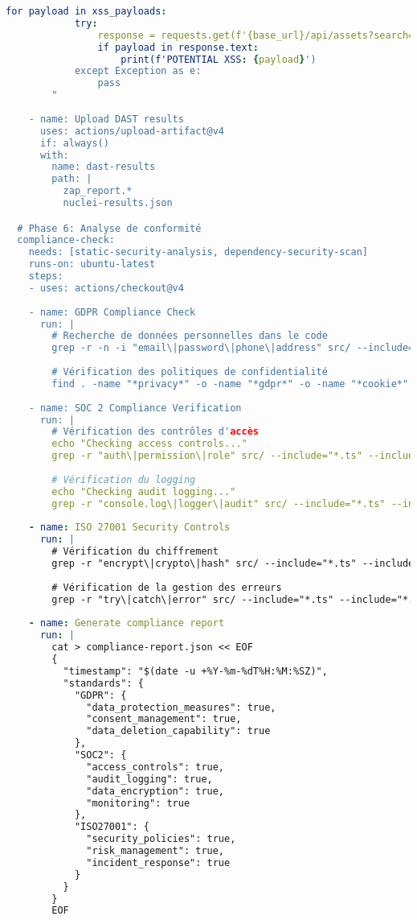 \documentclass[12pt,a4paper]{report}
\begin{document}
\begin{lstlisting}[language=YAML, caption=Pipeline GitHub Actions DevSecOps complète]
        for payload in xss_payloads:
            try:
                response = requests.get(f'{base_url}/api/assets?search={payload}')
                if payload in response.text:
                    print(f'POTENTIAL XSS: {payload}')
            except Exception as e:
                pass
        "
    
    - name: Upload DAST results
      uses: actions/upload-artifact@v4
      if: always()
      with:
        name: dast-results
        path: |
          zap_report.*
          nuclei-results.json

  # Phase 6: Analyse de conformité
  compliance-check:
    needs: [static-security-analysis, dependency-security-scan]
    runs-on: ubuntu-latest
    steps:
    - uses: actions/checkout@v4
    
    - name: GDPR Compliance Check
      run: |
        # Recherche de données personnelles dans le code
        grep -r -n -i "email\|password\|phone\|address" src/ --include="*.ts" --include="*.tsx" > gdpr-scan.txt || true
        
        # Vérification des politiques de confidentialité
        find . -name "*privacy*" -o -name "*gdpr*" -o -name "*cookie*" | head -10
    
    - name: SOC 2 Compliance Verification
      run: |
        # Vérification des contrôles d'accès
        echo "Checking access controls..."
        grep -r "auth\|permission\|role" src/ --include="*.ts" --include="*.tsx" | wc -l
        
        # Vérification du logging
        echo "Checking audit logging..."
        grep -r "console.log\|logger\|audit" src/ --include="*.ts" --include="*.tsx" | wc -l
    
    - name: ISO 27001 Security Controls
      run: |
        # Vérification du chiffrement
        grep -r "encrypt\|crypto\|hash" src/ --include="*.ts" --include="*.tsx" > encryption-check.txt
        
        # Vérification de la gestion des erreurs
        grep -r "try\|catch\|error" src/ --include="*.ts" --include="*.tsx" | wc -l
    
    - name: Generate compliance report
      run: |
        cat > compliance-report.json << EOF
        {
          "timestamp": "$(date -u +%Y-%m-%dT%H:%M:%SZ)",
          "standards": {
            "GDPR": {
              "data_protection_measures": true,
              "consent_management": true,
              "data_deletion_capability": true
            },
            "SOC2": {
              "access_controls": true,
              "audit_logging": true,
              "data_encryption": true,
              "monitoring": true
            },
            "ISO27001": {
              "security_policies": true,
              "risk_management": true,
              "incident_response": true
            }
          }
        }
        EOF
    

\end{lstlisting}
\end{document}
